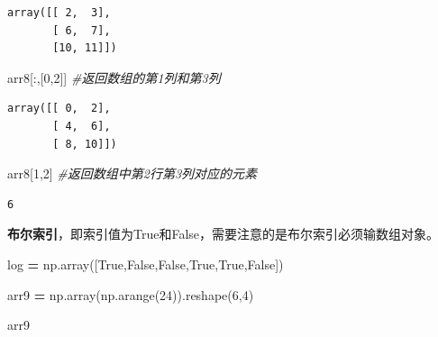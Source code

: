 \documentclass[]{article}
\newenvironment{Shaded}{\begin{snugshade}}{\end{snugshade}}
\newcommand{\DecValTok}[1]{\textcolor[rgb]{0.00,0.00,0.81}{#1}}
\newcommand{\CommentTok}[1]{\textcolor[rgb]{0.56,0.35,0.01}{\textit{#1}}}
\newcommand{\VariableTok}[1]{\textcolor[rgb]{0.00,0.00,0.00}{#1}}
\newcommand{\OperatorTok}[1]{\textcolor[rgb]{0.81,0.36,0.00}{\textbf{#1}}}
\newcommand{\NormalTok}[1]{#1}
\begin{document}
\begin{verbatim}
array([[ 2,  3],
       [ 6,  7],
       [10, 11]])
\end{verbatim}

\begin{Shaded}
\begin{Highlighting}[]
\NormalTok{arr8[:,[}\DecValTok{0}\NormalTok{,}\DecValTok{2}\NormalTok{]] }\CommentTok{#返回数组的第1列和第3列}
\end{Highlighting}
\end{Shaded}

\begin{verbatim}
array([[ 0,  2],
       [ 4,  6],
       [ 8, 10]])
\end{verbatim}

\begin{Shaded}
\begin{Highlighting}[]
\NormalTok{arr8[}\DecValTok{1}\NormalTok{,}\DecValTok{2}\NormalTok{] }\CommentTok{#返回数组中第2行第3列对应的元素}
\end{Highlighting}
\end{Shaded}

\begin{verbatim}
6
\end{verbatim}

\textbf{布尔索引}，即索引值为True和False，需要注意的是布尔索引必须输数组对象。

\begin{Shaded}
\begin{Highlighting}[]
\NormalTok{log }\OperatorTok{=}\NormalTok{ np.array([}\VariableTok{True}\NormalTok{,}\VariableTok{False}\NormalTok{,}\VariableTok{False}\NormalTok{,}\VariableTok{True}\NormalTok{,}\VariableTok{True}\NormalTok{,}\VariableTok{False}\NormalTok{])}
\end{Highlighting}
\end{Shaded}

\begin{Shaded}
\begin{Highlighting}[]
\NormalTok{arr9 }\OperatorTok{=}\NormalTok{ np.array(np.arange(}\DecValTok{24}\NormalTok{)).reshape(}\DecValTok{6}\NormalTok{,}\DecValTok{4}\NormalTok{)}
\end{Highlighting}
\end{Shaded}

\begin{Shaded}
\begin{Highlighting}[]
\NormalTok{arr9}
\end{Highlighting}
\end{Shaded}
\end{document}
